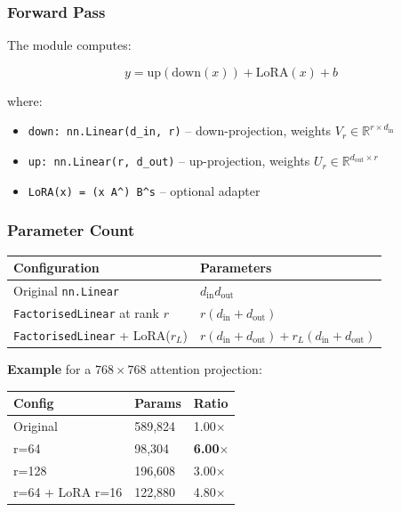 \subsubsection{Forward Pass}

The module computes:

\[
y = \text{up}(\text{down}(x)) + \text{LoRA}(x) + b
\tag{4.2}
\]

where:

\begin{itemize}
\item \texttt{down: nn.Linear(d\_in, r)} -- down-projection, weights $V_r \in \mathbb{R}^{r \times d_\text{in}}$
\item \texttt{up: nn.Linear(r, d\_out)} -- up-projection, weights $U_r \in \mathbb{R}^{d_\text{out} \times r}$
\item \texttt{LoRA(x) = (x A^\top) B^\top \cdot s} -- optional adapter

\end{itemize}
\subsubsection{Parameter Count}

\begin{table}[H]
\centering
\small
\begin{tabular}{ll}
\toprule
\textbf{Configuration} & \textbf{Parameters} \\
\midrule
Original \texttt{nn.Linear} & $d_\text{in} d_\text{out}$ \\
\texttt{FactorisedLinear} at rank $r$ & $r(d_\text{in} + d_\text{out})$ \\
\texttt{FactorisedLinear} + LoRA($r_L$) & $r(d_\text{in} + d_\text{out}) + r_L(d_\text{in} + d_\text{out})$ \\
\bottomrule
\end{tabular}
\end{table}

\textbf{Example} for a $768 \times 768$ attention projection:

\begin{table}[H]
\centering
\small
\begin{tabular}{lll}
\toprule
\textbf{Config} & \textbf{Params} & \textbf{Ratio} \\
\midrule
Original & 589,824 & 1.00$\times$ \\
r=64 & 98,304 & \textbf{6.00$\times$} \\
r=128 & 196,608 & 3.00$\times$ \\
r=64 + LoRA r=16 & 122,880 & 4.80$\times$ \\
\bottomrule
\end{tabular}
\end{table}

